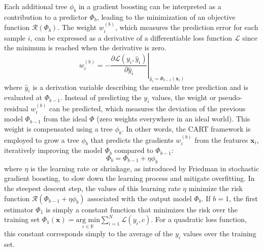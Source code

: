 \documentclass[main]{subfiles}
\begin{document}
Each additional tree $\phi_{b}$ in a gradient boosting can be interpreted as a contribution to a predictor $\Phi_{b}$, leading to the minimization of an objective function $\mathcal{R}(\Phi_{b})$. The weight $w_i^{(b)}$, which measures the prediction error for each sample $i$, can be expressed as a derivative of a differentiable loss function $\mathcal{L}$ since the minimum is reached when the derivative is zero. 
\begin{equation}
  w_i^{(b)} = -\left.\frac{\partial\mathcal{L}\left(y_i,\hat{y}_i\right)}{\partial\hat{y}_i}\right|_{\hat{y}_i=\Phi_{b-1}(\mathbf{x}_i)}
\end{equation}
where $\hat{y}_i$ is a derivation variable describing the ensemble tree prediction and is evaluated at $\Phi_{b-1}$. Instead of predicting the $y_i$ values, the weight or pseudo-residual $w_i^{(b)}$ can be predicted, which measures the deviation of the previous model $\Phi_{b-1}$ from the ideal $\Phi$ (zero weights everywhere in an ideal world). This weight is compensated using a tree $\phi_{b}$. In other words, the CART framework is employed to grow a tree $\phi_{b}$ that predicts the gradients $w_i^{(b)}$ from the features $\mathbf{x}_i$, iteratively improving the model $\Phi_b$ compared to $\Phi_{b-1}$: 
\begin{equation}
  \Phi_b = \Phi_{b-1} + \eta \phi_{b}
\end{equation}
where $\eta$ is the learning rate or shrinkage, as introduced by Friedman in stochastic gradient boosting, to slow down the learning process and mitigate overfitting.\autocite{Friedman2002} In the steepest descent step, the values of this learning rate $\eta$ minimize the risk function $\mathcal{R}(\Phi_{b-1} + \eta \phi_{b})$ associated with the output model $\Phi_b$. If $b=1$, the first estimator $\Phi_1$ is simply a constant function that minimizes the risk over the training set $\Phi_1(\mathbf{x}) = \underset{c\in \mathbb{R}}{\text{arg min}} \sum_{i=1}^{N}\mathcal{L}(y_i,c)$. For a quadratic loss function, this constant corresponds simply to the average of the $y_i$ values over the training set.
\end{document}
